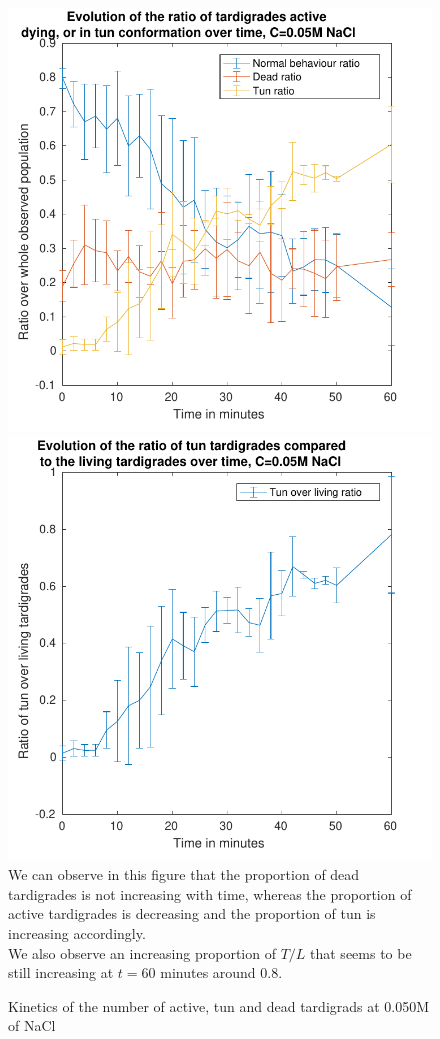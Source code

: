 \documentclass[12pt,a4paper, twocolumn]{article}
\begin{document}
\begin{figure}
\includegraphics[width=\linewidth]{005.pdf}
\includegraphics[width=\linewidth]{005t.pdf}
\label{fig005}
We can observe in this figure that the proportion of dead tardigrades is not increasing with time, whereas the proportion of active tardigrades is decreasing and the proportion of tun is increasing accordingly.\\ We also observe an increasing proportion of $T/L$ that seems to be still increasing at $t=60$ minutes around $0.8$.
\caption{Kinetics of the number of active, tun and dead tardigrads at 0.050M of NaCl}
\end{figure}
\end{document}
